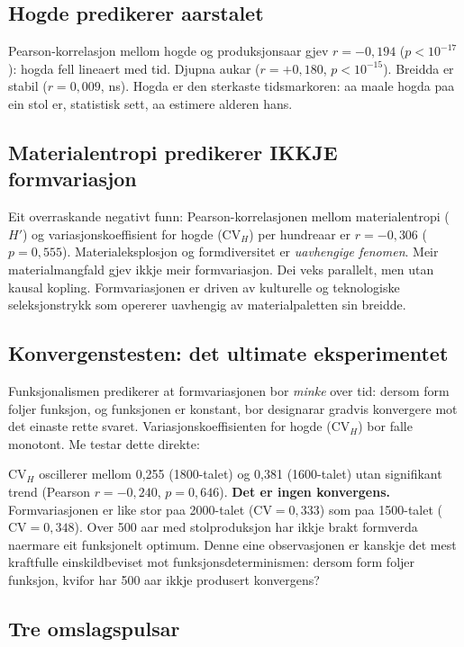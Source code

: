 \documentclass[10pt, a4paper, twocolumn]{article}
\begin{document}
\subsection{Hogde predikerer aarstalet}

Pearson-korrelasjon mellom hogde og produksjonsaar gjev $r = -0{,}194$ ($p < 10^{-17}$): hogda fell lineaert med tid. Djupna aukar ($r = +0{,}180$, $p < 10^{-15}$). Breidda er stabil ($r = 0{,}009$, ns). Hogda er den sterkaste tidsmarkoren: aa maale hogda paa ein stol er, statistisk sett, aa estimere alderen hans.

\subsection{Materialentropi predikerer IKKJE formvariasjon}

Eit overraskande negativt funn: Pearson-korrelasjonen mellom materialentropi ($H'$) og variasjonskoeffisient for hogde ($\text{CV}_H$) per hundreaar er $r = -0{,}306$ ($p = 0{,}555$). Materialeksplosjon og formdiversitet er \emph{uavhengige fenomen}. Meir materialmangfald gjev ikkje meir formvariasjon. Dei veks parallelt, men utan kausal kopling. Formvariasjonen er driven av kulturelle og teknologiske seleksjonstrykk som opererer uavhengig av materialpaletten sin breidde.

\subsection{Konvergenstesten: det ultimate eksperimentet}

Funksjonalismen predikerer at formvariasjonen bor \emph{minke} over tid: dersom form foljer funksjon, og funksjonen er konstant, bor designarar gradvis konvergere mot det einaste rette svaret. Variasjonskoeffisienten for hogde ($\text{CV}_H$) bor falle monotont. Me testar dette direkte:

$\text{CV}_H$ oscillerer mellom 0,255 (1800-talet) og 0,381 (1600-talet) utan signifikant trend (Pearson $r = -0{,}240$, $p = 0{,}646$). \textbf{Det er ingen konvergens.} Formvariasjonen er like stor paa 2000-talet ($\text{CV} = 0{,}333$) som paa 1500-talet ($\text{CV} = 0{,}348$). Over 500 aar med stolproduksjon har ikkje brakt formverda naermare eit funksjonelt optimum. Denne eine observasjonen er kanskje det mest kraftfulle einskildbeviset mot funksjonsdeterminismen: dersom form foljer funksjon, kvifor har 500 aar ikkje produsert konvergens?

\subsection{Tre omslagspulsar}
\end{document}
